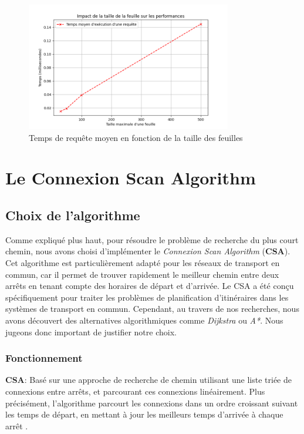 \documentclass[12pt]{article}
\begin{document}
\begin{figure}[h]
    \centering
    \includegraphics[width=0.8\textwidth]{images/average-query-time.png}
    \caption{Temps de requête moyen en fonction de la taille des feuilles}
\end{figure}


\newpage
\section{Le Connexion Scan Algorithm}
\subsection{Choix de l'algorithme}
Comme expliqué plus haut, pour résoudre le problème de recherche du plus court chemin, nous avons choisi d'implémenter le \emph{Connexion Scan Algorithm} (\textbf{CSA}).
Cet algorithme est particulièrement adapté pour les réseaux de transport en commun, car il permet de trouver rapidement le meilleur chemin
entre deux arrêts en tenant compte des horaires de départ et d'arrivée. Le CSA a été conçu spécifiquement pour traiter les problèmes de planification d'itinéraires 
dans les systèmes de transport en commun. Cependant, au travers de nos recherches, nous avons découvert des alternatives algorithmiques comme \emph{Dijkstra} ou \emph{A*}.
Nous jugeons donc important de justifier notre choix.

\subsubsection{Fonctionnement}
\textbf{CSA}: Basé sur une approche de recherche de chemin utilisant une liste triée de connexions entre arrêts, et parcourant ces connexions linéairement.
Plus précisément, l'algorithme parcourt les connexions dans un ordre croissant suivant les temps de départ, en mettant à jour les meilleurs temps d'arrivée à 
chaque arrêt  \cite{dibbelt2017connection}.
\end{document}
